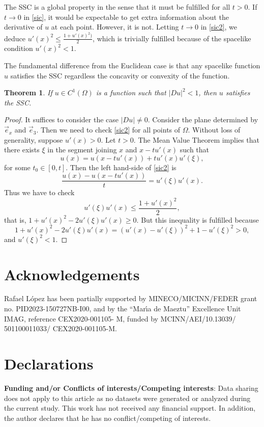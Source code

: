 \documentclass[a4paper,12pt]{amsart}
\newtheorem{theorem}{Theorem}[section]
\theoremstyle{definition}
\begin{document}
 The SSC  is a global property in the sense that it must be fulfilled for all $t>0$. If $t\to 0$ in \eqref{sic}, it would be expectable to get extra information about the derivative of $u$ at each point. However, it is not.  
Letting $t\to 0$ in \eqref{sic2},   we deduce $ u'(x)^2\leq \frac{ 1+u'(x)^2)}{2}$, which  is trivially fulfilled because of the spacelike condition $u'(x)^2<1$.    

The fundamental difference from the Euclidean case is that any spacelike function $u$ satisfies the SSC regardless the concavity or convexity of the function.

 
\begin{theorem} \label{t61}
If $u\in C^1(\Omega)$ is a function such that $|Du|^2<1$, then $u$ satisfies the SSC.
\end{theorem} 

\begin{proof} It suffices to consider the case $|Du|\not=0$. Consider the plane  determined by $\vec{e}_x$ and $\vec{e}_3$. Then we need to check \eqref{sic2} for all points of $\Omega$. Without loss of generality, suppose $u'(x)>0$. Let $t>0$. The Mean Value Theorem implies that there exists $\xi$ in the segment joining $x$ and $x-tu'(x)$  such that 
$$u(x)=u(x-t u'(x))+tu'(x) u'(\xi),$$
for some $ t_0\in [0,t]$. 
Then the left hand-side of \eqref{sic2} is
$$\frac{u(x)-u(x-t u'(x))}{t}=u'(\xi)u'(x).$$
Thus we have to check 
$$u'(\xi)u'(x)\leq \frac{1+u'(x)^2}{2},$$
that is,  $1+u'(x)^2-2u'(\xi)u'(x)\geq 0$. But this inequality is fulfilled  because 
$$1+u'(x)^2-2u'(\xi)u'(x)=(u'(x)-u'(\xi))^2+1-u'(\xi)^2> 0,$$
and $u'(\xi)^2<1$.
\end{proof}
   




  \section*{Acknowledgements}
Rafael L\'opez  has been partially supported by MINECO/MICINN/FEDER grant no. PID2023-150727NB-I00,  and by the ``Mar\'{\i}a de Maeztu'' Excellence Unit IMAG, reference CEX2020-001105- M, funded by MCINN/AEI/10.13039/ 501100011033/ CEX2020-001105-M.


\section*{Declarations}
{\bf Funding and/or Conflicts of interests/Competing interests}:  Data sharing does not apply to this article as no datasets were generated or analyzed
during the current study. This work has not received any financial support. In addition, the author declares
that he has no conflict/competing of interests. 
\end{document}
